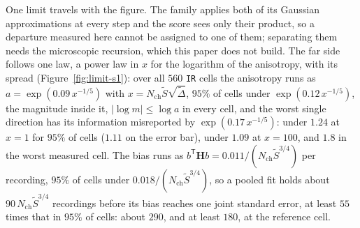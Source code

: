 One limit travels with the figure. The family applies both of its Gaussian approximations at every
step and the score sees only their product, so a departure measured here cannot be assigned to one of
them; separating them needs the microscopic recursion, which this paper does not build. The far side follows one law, a power law in $x$ for the logarithm of the anisotropy, with its spread (Figure~\ref{fig:limit-s1}): over all
$560$ \texttt{IR} cells the anisotropy runs as $a = \exp(0.09\,x^{-1/5})$ with
$x = N_{\mathrm{ch}}\widetilde{S}\sqrt{\widetilde{\Delta}}$, $95\%$ of cells under $\exp(0.12\,x^{-1/5})$, the
magnitude inside it, $|\log m| \le \log a$ in every cell, and the worst single direction has its information
misreported by $\exp(0.17\,x^{-1/5})$: under $1.24$ at $x = 1$ for $95\%$ of cells ($1.11$ on the error bar),
under $1.09$ at $x = 100$, and $1.8$ in the worst measured cell. The bias runs as
$b^{\mathsf{T}}\mathbf{H}b = 0.011/(N_{\mathrm{ch}}\widetilde{S}^{3/4})$ per recording, $95\%$ of cells under
$0.018/(N_{\mathrm{ch}}\widetilde{S}^{3/4})$, so a pooled fit holds about $90\,N_{\mathrm{ch}}\widetilde{S}^{3/4}$
recordings before its bias reaches one joint standard error, at least $55$ times that in $95\%$ of cells: about
$290$, and at least $180$, at the reference cell. %

